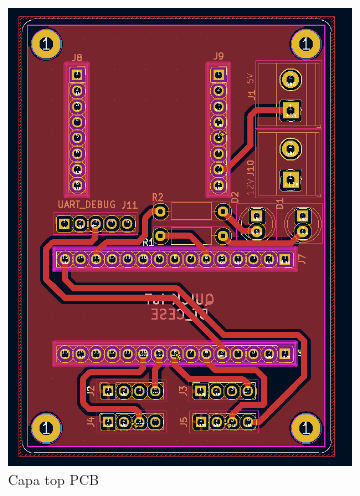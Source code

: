 \begin{figure}[h!]
  \centering
  \begin{subfigure}[b]{0.45\linewidth}
  \includegraphics[width=\linewidth]{./Figures/pcb_top.png}
  \caption{Capa top PCB}
  \label{fig:Capa top PCB}
  \end{subfigure}
  \begin{subfigure}[b]{0.44\linewidth}

\end{subfigure}
\end{figure}
